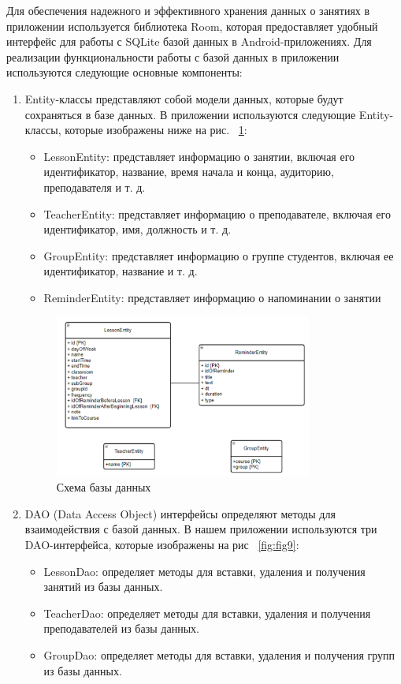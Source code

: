 \documentclass{vsureport}
\begin{document}
Для обеспечения надежного и эффективного хранения данных о занятиях в приложении используется библиотека Room, которая предоставляет удобный интерфейс для работы с SQLite базой данных в Android-приложениях. Для реализации функциональности работы с базой данных в приложении используются следующие основные компоненты:
\begin{enumerate}
	\item Entity-классы представляют собой модели данных, которые будут сохраняться в базе данных. В приложении используются следующие Entity-классы, которые изображены ниже на рис. ~\ref{fig:fig8}:
		\begin{itemize}
		\item LessonEntity: представляет информацию о занятии, включая его идентификатор, название, время начала и конца, аудиторию, преподавателя и т. д.
		\item TeacherEntity: представляет информацию о преподавателе, включая его идентификатор, имя, должность и т. д.
		\item GroupEntity: представляет информацию о группе студентов, включая ее идентификатор, название и т. д.
		\item ReminderEntity: представляет информацию о напоминании о занятии
		\end{itemize}
		\begin{figure}[H]
			\centering
			\includegraphics[width=0.8\textwidth]{8.png}
			\caption{Схема базы данных}
			\label{fig:fig8}
		\end{figure} 
		
	\item DAO (Data Access Object) интерфейсы определяют методы для взаимодействия с базой данных. В нашем приложении используются три DAO-интерфейса, которые изображены на рис ~\ref{fig:fig9}:
		\begin{itemize}
		\item LessonDao: определяет методы для вставки, удаления и получения занятий из базы данных.
		\item TeacherDao: определяет методы для вставки, удаления и получения преподавателей из базы данных.
		\item GroupDao: определяет методы для вставки, удаления и получения групп из базы данных.
		\end{itemize}
\end{enumerate}
\end{document}
